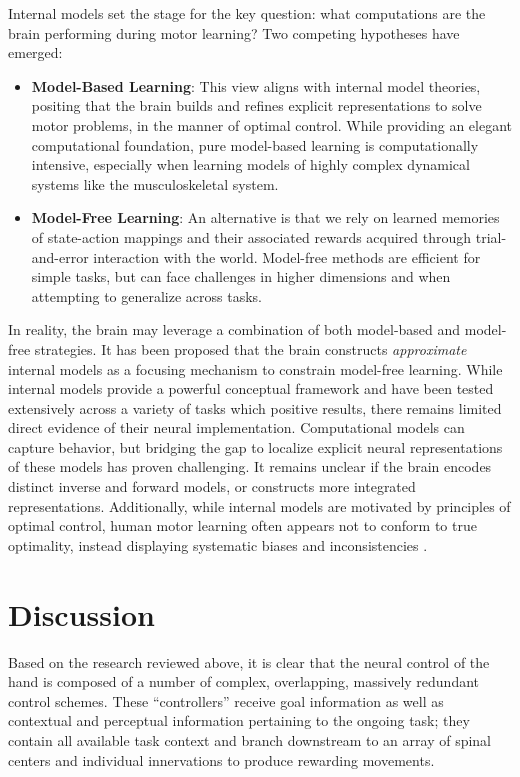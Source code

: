 \documentclass[../main.tex]{subfiles}
\begin{document}
Internal models set the stage for the key question: what computations are the brain performing during motor learning? Two competing hypotheses have emerged:
%
\begin{itemize}
  \item \textbf{Model-Based Learning}: This view aligns with internal model theories, positing that the brain builds and refines explicit representations to solve motor problems, in the manner of optimal control. While providing an elegant computational foundation, pure model-based learning is computationally intensive, especially when learning models of highly complex dynamical systems like the musculoskeletal system.
  \item \textbf{Model-Free Learning}: An alternative is that we rely on learned memories of state-action mappings and their associated rewards acquired through trial-and-error interaction with the world. Model-free methods are efficient for simple tasks, but can face challenges in higher dimensions and when attempting to generalize across tasks. 
\end{itemize}
%
In reality, the brain may leverage a combination of both model-based and model-free strategies. It has been proposed that the brain constructs \emph{approximate} internal models as a focusing mechanism to constrain model-free learning\cite{dawModelBasedInfluencesHumans2011}. While internal models provide a powerful conceptual framework and have been tested extensively across a variety of tasks which positive results, there remains limited direct evidence of their neural implementation. Computational models can capture behavior, but bridging the gap to localize explicit neural representations of these models has proven challenging. It remains unclear if the brain encodes distinct inverse and forward models, or constructs more integrated representations. Additionally, while internal models are motivated by principles of optimal control, human motor learning often appears not to conform to true optimality, instead displaying systematic biases and inconsistencies \cite{loebHierarchicalFoundationModels1999,loebHardLessonsMotor1987}.





\section{Discussion}

Based on the research reviewed above, it is clear that the neural control of the hand is composed of a number of complex, overlapping, massively redundant control schemes. These ``controllers'' receive goal information as well as contextual and perceptual information pertaining to the ongoing task; they contain all available task context and branch downstream to an array of spinal centers and individual innervations to produce rewarding movements.
\end{document}
